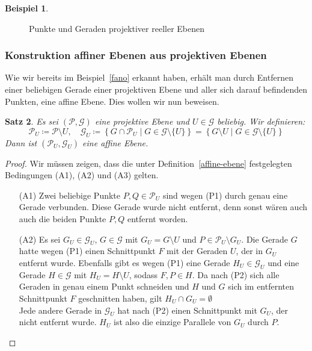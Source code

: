 \documentclass[hidelinks]{article}
\theoremstyle{plain}
\newtheorem{thm}{Satz}[section]
\theoremstyle{definition}
\newtheorem{bsp}[thm]{Beispiel}
\theoremstyle{rem}
\newcommand{\pu}{\mathcal{P}_U}
\newcommand{\gu}{\mathcal{G}_U}
\begin{document}
\begin{sloppypar}
\begin{bsp}
\begin{figure}[H]
\begin{tikzpicture}[
		tdplot_main_coords,
		axis/.style={->,black,thick},
		line/.style={thick,red},
		scale=0.8]
\end{tikzpicture}
	\caption{Punkte und Geraden projektiver reeller Ebenen}
\end{figure}
\end{bsp}


\subsubsection{Konstruktion affiner Ebenen aus projektiven Ebenen} \label{konstr-aff-aus-proj}
Wie wir bereits im Beispiel~\ref{fano} erkannt haben, erhält man durch Entfernen einer beliebigen Gerade einer projektiven Ebene und aller sich darauf befindenden Punkten, eine affine Ebene. Dies wollen wir nun beweisen.
\begin{thm} \label{projektive-zu-affinen}
Es sei $(\mathcal{P},\mathcal{G})$ eine projektive Ebene und $U\in\mathcal{G}$ beliebig. Wir definieren:
\begin{equation*}
	\pu\coloneqq\mathcal{P}\setminus{U},\quad \gu\coloneqq\left\{G\cap\pu\mid G\in\mathcal{G}\setminus\{U\}\right\}=\left\{G\setminus U\mid G\in\mathcal{G}\setminus \{U\}\right\}
\end{equation*}
Dann ist $(\pu,\gu)$ eine affine Ebene.
\end{thm}
\begin{proof}
Wir müssen zeigen, dass die unter Definition~\ref{affine-ebene} festgelegten Bedingungen (A1), (A2) und (A3) gelten.
\begin{enumerate}
	\item[(A1)] Zwei beliebige Punkte $P,Q\in\pu$ sind wegen (P1) durch genau eine Gerade verbunden. Diese Gerade wurde nicht entfernt, denn sonst wären auch auch die beiden Punkte $P,Q$ entfernt worden.
	\item[(A2)] Es sei $G_U\in\gu$, $G\in\mathcal{G}$ mit $G_U=G\setminus U$ und $P\in\pu\setminus G_U$. Die Gerade $G$ hatte wegen (P1) einen Schnittpunkt $F$ mit der Geraden $U$, der in $G_U$ entfernt wurde. Ebenfalls gibt es wegen (P1) eine Gerade $H_U\in\gu$ und eine Gerade $H\in\mathcal{G}$ mit $H_U=H\setminus U$, sodass $F,P\in H$. Da nach (P2) sich alle Geraden in genau einem Punkt schneiden und $H$ und $G$ sich im entfernten Schnittpunkt $F$ geschnitten haben, gilt $H_U\cap G_U=\emptyset$\\
	Jede andere Gerade in $\gu$ hat nach (P2) einen Schnittpunkt mit $G_U$, der nicht entfernt wurde. $H_U$ ist also die einzige Parallele von $G_U$ durch $P$.
\begin{figure}[H]
\centering
 \begin{tikzpicture}[scale=1,domain=0:4] 

\end{tikzpicture}
\end{figure}
\end{enumerate}
\end{proof}
\end{sloppypar}
\end{document}
